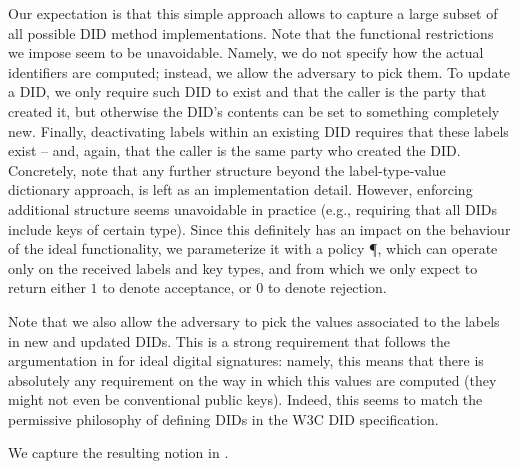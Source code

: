 Our expectation is that this simple approach allows to capture a large
subset of all possible DID method implementations. Note that the functional
restrictions we impose seem to be unavoidable. Namely, we do not specify how
the actual identifiers are computed; instead, we allow the adversary to pick
them. To update a DID, we only require such DID to exist and that the caller
is the party that created it, but otherwise the DID's contents can be set to
something completely new. Finally, deactivating labels within an existing DID
requires that these labels exist -- and, again, that the caller is the same
party who created the DID. Concretely, note that any further structure beyond
the label-type-value dictionary approach, is left as an implementation detail.
However, enforcing additional structure seems unavoidable in practice (e.g.,
requiring that all DIDs include keys of certain type). Since this definitely
has an impact on the behaviour of the ideal functionality, we parameterize it
with a policy \P, which can operate only on the received labels and key types,
and from which we only expect to return either $1$ to denote acceptance, or $0$
to denote rejection.

Note that we also allow the adversary to pick the values associated to the
labels in new and updated DIDs. This is a strong requirement that follows the
argumentation in \cite{canetti03} for ideal digital signatures: namely, this
means that there is absolutely any requirement on the way in which this values
are computed (they might not even be conventional public keys). Indeed, this
seems to match the permissive philosophy of defining DIDs in the W3C DID
specification.

We capture the resulting notion in .

